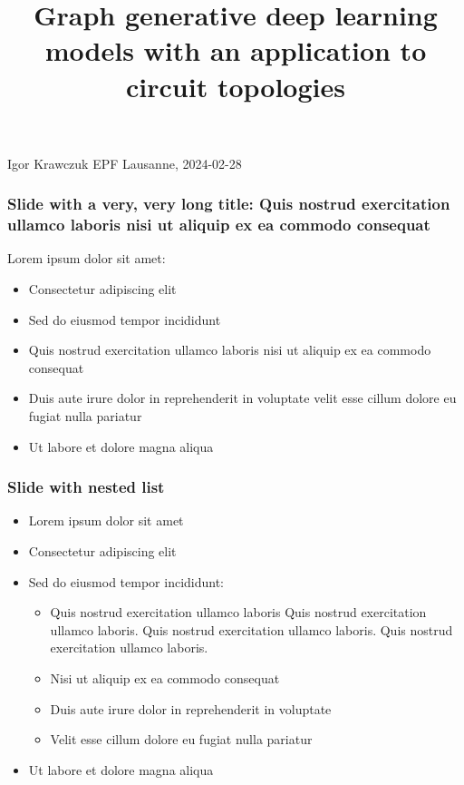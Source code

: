 \documentclass[11pt,xcolor={dvipsnames},hyperref={pdftex,pdfpagemode=UseNone,hidelinks,pdfdisplaydoctitle=true},usepdftitle=false]{beamer}
\begin{document}
\title{\justifying Graph generative deep learning models with an application to circuit topologies}
\information%
{Igor Krawczuk}%
{EPF Lausanne,  2024-02-28}
\frame[label=title]{\titlepage}








\begin{frame}
\frametitle{Slide with a very, very long title: Quis nostrud exercitation ullamco laboris nisi ut aliquip ex ea commodo consequat}
Lorem ipsum dolor sit amet:
\begin{itemize}
\item Consectetur adipiscing elit
\item Sed do eiusmod tempor incididunt
\item Quis nostrud exercitation ullamco laboris nisi ut aliquip ex ea commodo consequat
\item Duis aute irure dolor in reprehenderit in voluptate velit esse cillum dolore eu fugiat nulla pariatur
\item Ut labore et dolore magna aliqua
\end{itemize}
\end{frame}

\begin{frame}
\frametitle{Slide with nested list}
\begin{itemize}
\item Lorem ipsum dolor sit amet
\item Consectetur adipiscing elit
\item Sed do eiusmod tempor incididunt:
\begin{itemize}
\item Quis nostrud exercitation ullamco laboris Quis nostrud exercitation ullamco laboris. Quis nostrud exercitation ullamco laboris. Quis nostrud exercitation ullamco laboris.
\item Nisi ut aliquip ex ea commodo consequat
\item Duis aute irure dolor in reprehenderit in voluptate
\item Velit esse cillum dolore eu fugiat nulla pariatur
\end{itemize}
\item Ut labore et dolore magna aliqua
\end{itemize}
\end{frame}
\end{document}
